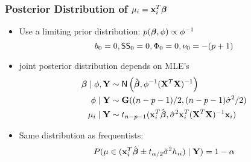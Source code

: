 \documentclass[handout]{beamer}\usepackage[]{graphicx}\usepackage[]{color}
\begin{document}
\begin{frame} \frametitle{Posterior Distribution of $\mu_i = \mathbf{x}^T_i \boldsymbol{\beta}$}

\begin{itemize}
\item Use a limiting prior distribution: $p(\boldsymbol{\beta}, \phi) \propto \phi^{-1}$
$$b_0 = 0, \textsf{SS}_0 = 0, \Phi_0 = 0, \nu_0 =  -(p+1)$$

\item joint posterior distribution depends on MLE's
\begin{align*}
\boldsymbol{\beta} \mid \phi, \mathbf{Y} & \sim  \textsf{N}\left(\hat{\boldsymbol{\beta}}, \phi^{-1}(\mathbf{X}^T\mathbf{X})^{-1}\right) \\
\phi \mid \mathbf{Y} & \sim  \mathbf{G}((n - p -1)/2, (n - p - 1)\hat \sigma^2/2) \\
\mu_i \mid \mathbf{Y} & \sim t_{n -p -1}(\mathbf{x}^T_i\hat{\boldsymbol{\beta}},  \hat{\sigma}^2 \mathbf{x}_i^T (\mathbf{X}^T\mathbf{X})^{-1}\mathbf{x}_i)
\end{align*}
\item Same distribution as frequentists:
$$P( \mu  \in  (
\mathbf{x}_i^T\hat{\boldsymbol{\beta}} \pm t_{\alpha/2} \hat{\sigma}^2 h_{ii})
\mid \mathbf{Y}) = 1 - \alpha $$
\end{itemize}

\end{frame}
\end{document}
